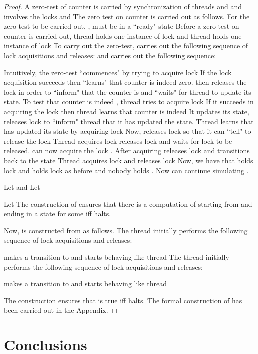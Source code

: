\documentclass{LMCS}
\begin{document}
\begin{proof}
 
 
 
 A zero-test of  counter  is carried by synchronization of threads  and  and involves  the locks 
  and  The zero test on counter  is carried out as follows.  
 For the zero test to be carried out, , must be in a ``ready" state   
 Before a zero-test on counter  is carried out,  
  thread  holds one instance of lock  and thread  holds one instance of lock  To carry out the zero-test,  carries out the following sequence of lock acquisitions and releases:
   and
  carries out the following sequence:
  
 
 
 
 Intuitively, the zero-test ``commences" by  trying to acquire lock  If the lock acquisition succeeds then  ``learns" that counter  is indeed 
zero.  then releases the lock  in order to ``inform"  that the counter  is  and ``waits" for 
thread  to update its state. To test that counter  is indeed , thread  tries to acquire
lock  If it succeeds in acquiring the lock then thread  learns that counter  is indeed  It updates its state, releases lock  to  ``inform"  thread  that it has updated the state. Thread  learns that   has updated its state by acquiring lock  Now,   releases lock  so that it can ``tell"  to release the lock 
Thread  acquires lock  releases lock  and waits for lock  to be released.  can now acquire  the lock . After acquiring     releases lock  and transitions back to the state  Thread  acquires lock  and releases lock  
Now, we have that  holds lock  and  holds lock  as before and nobody holds . Now  can continue
simulating .

Let  and   Let
   
Let 
The construction of
 ensures that there is a computation of  starting from  and ending in a state  for some  iff  halts.

Now,  is constructed from  as follows. The thread  initially performs the following sequence of lock acquisitions and releases:
 
makes a transition to  and starts behaving like thread 
The thread  initially performs the following sequence of lock acquisitions and releases:

makes a transition to  and starts behaving like thread  

The construction ensures that  is true iff  halts. 
The formal construction of  has been carried out in the Appendix.
\end{proof}




\section{Conclusions}
\label{sec:conclusions}
\end{document}
